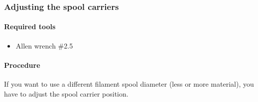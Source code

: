 \subsubsection{Adjusting the spool carriers}

\paragraph{Required tools}
 
\begin{itemize}
  \item Allen wrench \#2.5
\end{itemize}

\paragraph{Procedure}

If you want to use a different filament spool diameter (less or more material), you have to adjust the spool carrier position.

